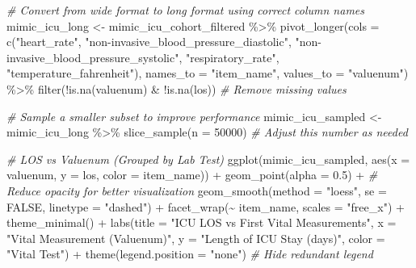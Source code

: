 \documentclass[
]{article}
\newenvironment{Shaded}{\begin{snugshade}}{\end{snugshade}}
\newcommand{\AttributeTok}[1]{\textcolor[rgb]{0.77,0.63,0.00}{#1}}
\newcommand{\CommentTok}[1]{\textcolor[rgb]{0.56,0.35,0.01}{\textit{#1}}}
\newcommand{\ConstantTok}[1]{\textcolor[rgb]{0.00,0.00,0.00}{#1}}
\newcommand{\DecValTok}[1]{\textcolor[rgb]{0.00,0.00,0.81}{#1}}
\newcommand{\FloatTok}[1]{\textcolor[rgb]{0.00,0.00,0.81}{#1}}
\newcommand{\FunctionTok}[1]{\textcolor[rgb]{0.00,0.00,0.00}{#1}}
\newcommand{\NormalTok}[1]{\textcolor[rgb]{0.00,0.00,0.00}{#1}}
\newcommand{\OtherTok}[1]{\textcolor[rgb]{0.56,0.35,0.01}{#1}}
\newcommand{\SpecialCharTok}[1]{\textcolor[rgb]{0.00,0.00,0.00}{#1}}
\newcommand{\StringTok}[1]{\textcolor[rgb]{0.31,0.60,0.02}{#1}}
\begin{document}
\begin{Shaded}
\begin{Highlighting}[]
\CommentTok{\# Convert from wide format to long format using correct column names}
\NormalTok{mimic\_icu\_long }\OtherTok{\textless{}{-}}\NormalTok{ mimic\_icu\_cohort\_filtered }\SpecialCharTok{\%\textgreater{}\%}
  \FunctionTok{pivot\_longer}\NormalTok{(}\AttributeTok{cols =} \FunctionTok{c}\NormalTok{(}\StringTok{"heart\_rate"}\NormalTok{, }\StringTok{"non{-}invasive\_blood\_pressure\_diastolic"}\NormalTok{, }
                        \StringTok{"non{-}invasive\_blood\_pressure\_systolic"}\NormalTok{, }
                        \StringTok{"respiratory\_rate"}\NormalTok{, }
                        \StringTok{"temperature\_fahrenheit"}\NormalTok{),}
               \AttributeTok{names\_to =} \StringTok{"item\_name"}\NormalTok{, }\AttributeTok{values\_to =} \StringTok{"valuenum"}\NormalTok{) }\SpecialCharTok{\%\textgreater{}\%}
  \FunctionTok{filter}\NormalTok{(}\SpecialCharTok{!}\FunctionTok{is.na}\NormalTok{(valuenum) }\SpecialCharTok{\&} \SpecialCharTok{!}\FunctionTok{is.na}\NormalTok{(los))  }\CommentTok{\# Remove missing values}
\end{Highlighting}
\end{Shaded}

\begin{Shaded}
\begin{Highlighting}[]
\CommentTok{\# Sample a smaller subset to improve performance}
\NormalTok{mimic\_icu\_sampled }\OtherTok{\textless{}{-}}\NormalTok{ mimic\_icu\_long }\SpecialCharTok{\%\textgreater{}\%}
  \FunctionTok{slice\_sample}\NormalTok{(}\AttributeTok{n =} \DecValTok{50000}\NormalTok{)  }\CommentTok{\# Adjust this number as needed}

\CommentTok{\# LOS vs Valuenum (Grouped by Lab Test)}
\FunctionTok{ggplot}\NormalTok{(mimic\_icu\_sampled, }\FunctionTok{aes}\NormalTok{(}\AttributeTok{x =}\NormalTok{ valuenum, }\AttributeTok{y =}\NormalTok{ los, }\AttributeTok{color =}\NormalTok{ item\_name)) }\SpecialCharTok{+}
  \FunctionTok{geom\_point}\NormalTok{(}\AttributeTok{alpha =} \FloatTok{0.5}\NormalTok{) }\SpecialCharTok{+}  \CommentTok{\# Reduce opacity for better visualization}
  \FunctionTok{geom\_smooth}\NormalTok{(}\AttributeTok{method =} \StringTok{"loess"}\NormalTok{, }\AttributeTok{se =} \ConstantTok{FALSE}\NormalTok{, }\AttributeTok{linetype =} \StringTok{"dashed"}\NormalTok{) }\SpecialCharTok{+}  
  \FunctionTok{facet\_wrap}\NormalTok{(}\SpecialCharTok{\textasciitilde{}}\NormalTok{ item\_name, }\AttributeTok{scales =} \StringTok{"free\_x"}\NormalTok{) }\SpecialCharTok{+}  
  \FunctionTok{theme\_minimal}\NormalTok{() }\SpecialCharTok{+}
  \FunctionTok{labs}\NormalTok{(}\AttributeTok{title =} \StringTok{"ICU LOS vs First Vital Measurements"}\NormalTok{,}
       \AttributeTok{x =} \StringTok{"Vital Measurement (Valuenum)"}\NormalTok{, }\AttributeTok{y =} \StringTok{"Length of ICU Stay (days)"}\NormalTok{, }
       \AttributeTok{color =} \StringTok{"Vital Test"}\NormalTok{) }\SpecialCharTok{+}
  \FunctionTok{theme}\NormalTok{(}\AttributeTok{legend.position =} \StringTok{"none"}\NormalTok{)  }\CommentTok{\# Hide redundant legend}
\end{Highlighting}
\end{Shaded}
\end{document}
